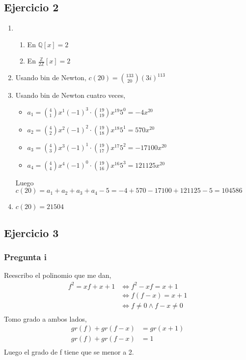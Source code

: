 \subsection{Ejercicio 2}

\begin{enumerate}
    \item \begin{enumerate}
        \item En $ \mathbb{Q}[x] = 2 $
        \item En $ \frac{\mathbb{Z}}{2\mathbb{Z}}[x] = 2 $
    \end{enumerate}
    \item Usando bin de Newton, $ c(20) = \binom{133}{20}(3i)^{113} $
    \item Usando bin de Newton cuatro veces, \begin{itemize}
        \item $ a_1 = \binom{4}{1}x^{1}(-1)^3 \cdot \binom{19}{19}x^{19}5^0 = -4x^{20} $
        \item $ a_2 = \binom{4}{2}x^{2}(-1)^2 \cdot \binom{19}{18}x^{18}5^1 = 570x^{20} $
        \item $ a_3 = \binom{4}{3}x^{3}(-1)^1 \cdot \binom{19}{17}x^{17}5^2 = -17100x^{20} $
        \item $ a_4 = \binom{4}{4}x^{4}(-1)^0 \cdot \binom{19}{16}x^{16}5^3 = 121125x^{20} $
    \end{itemize}
    Luego $ c(20) = a_1 + a_2 + a_3 + a_4 - 5 = -4+570-17100+121125 -5 = 104586 $
    \item $ c(20) = 21504 $
\end{enumerate}

\subsection{Ejercicio 3}

\subsubsection{Pregunta i}

Reescribo el polinomio que me dan,
\begin{align*}
    f^2 = xf + x + 1 &\iff f^2 - xf = x+1 \\
    &\iff f(f-x) = x+1 \\
    &\iff f\neq 0 \wedge f-x \neq 0 \\
\end{align*}
Tomo grado a ambos lados,
\begin{align*}
    gr(f) + gr(f-x) &= gr(x+1) \\
    gr(f) + gr(f-x) &= 1 \\
\end{align*}
Luego el grado de f tiene que se menor a 2.

